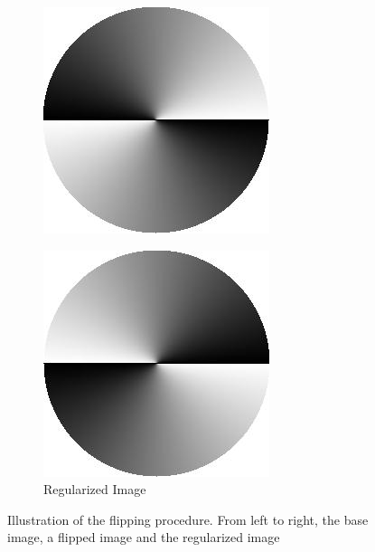 \begin{figure}[h]
\begin{subfigure}[b]{0.29\linewidth}
		\includegraphics[width=\linewidth]{Figures/Aug/flipped.jpg}
	\end{subfigure}
	\begin{subfigure}[b]{0.29\linewidth}
		\centering
		\caption*{\footnotesize Regularized Image}
		
		\includegraphics[width=\linewidth]{Figures/Aug/grad.jpg}
	\end{subfigure}
	\caption[Illustration of the flipping procedure.]{Illustration of the flipping procedure. From left to right, the base image, a flipped image and the regularized image}\label{flipreadtheo}
\end{figure}
